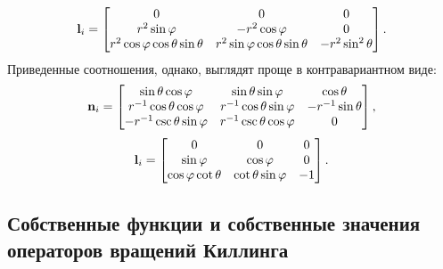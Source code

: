 \documentclass[12pt,a4paper]{article}
\begin{document}
        \begin{equation}
            \mathbf{l}_i
            =
            \begin{bmatrix}
                0
                    & 0
                    & 0 \\
                r^2 \sin\varphi
                    & - r^2 \cos\varphi
                    & 0 \\
                r^2 \cos\varphi \cos\theta \sin\theta
                    & r^2 \sin\varphi \cos\theta \sin\theta
                    & - r^2 \sin^2\theta
            \end{bmatrix}
            .
        \end{equation}
        Приведенные соотношения, однако, выглядят проще в контравариантном виде:
        \begin{equation}
            \mathbf{n}_i
            =
            \begin{bmatrix}
                \sin\theta \cos\varphi          & \sin\theta \sin\varphi        & \cos\theta \\
                r^{-1} \cos\theta \cos\varphi   & r^{-1} \cos\theta \sin\varphi & - r^{-1} \sin\theta \\
                - r^{-1} \csc\theta \sin\varphi & r^{-1} \csc\theta \cos\varphi & 0
            \end{bmatrix}
            ,
        \end{equation}
        \begin{equation}
            \mathbf{l}_i
            =
            \begin{bmatrix}
                0
                    & 0
                    & 0 \\
                \sin\varphi
                    & \cos\varphi
                    & 0 \\
                \cos\varphi \cot\theta
                    & \cot\theta \sin\varphi
                    & - 1
            \end{bmatrix}
            .
        \end{equation}


    \subsection{Собственные функции и собственные значения операторов вращений Киллинга}
\end{document}

